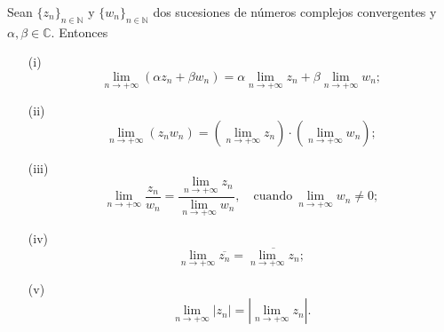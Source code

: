 \begin{teorema}
Sean $\{z_n\}_{n\in \mathbb{N}}$ y $\{w_n\}_{n\in \mathbb{N}}$  dos sucesiones de números complejos convergentes y $\alpha,\beta \in \mathbb{C}$. Entonces
\begin{itemize}
\item[(i)] $$\lim\limits_{n \to + \infty} (\alpha z_n + \beta w_n ) = \alpha \lim\limits_{n\to + \infty} z_n + \beta \lim\limits_{n\to + \infty} w_n;$$

\item[(ii)] $$\lim\limits_{n \to + \infty} ( z_n w_n) = \left( \lim\limits_{n\to + \infty} z_n\right) \cdot \left(\lim\limits_{n\to + \infty} w_n \right);$$

\item[(iii)] $$\lim\limits_{n \to + \infty} \frac{z_n}{w_n} = \frac{\lim\limits_{n\to + \infty} z_n}{\lim\limits_{n\to + \infty} w_n}, \quad \mbox{cuando} ~\lim\limits_{n\to + \infty} w_n \neq 0;$$

\item[(iv)] $$\lim\limits_{n \to + \infty} \overline{z_n} = \overline{\lim\limits_{n\to + \infty} z_n};$$

\item[(v)] $$\lim\limits_{n\to + \infty} |z_n| = \left| \lim\limits_{n\to + \infty} z_n\right|.$$
\end{itemize}
\end{teorema}

